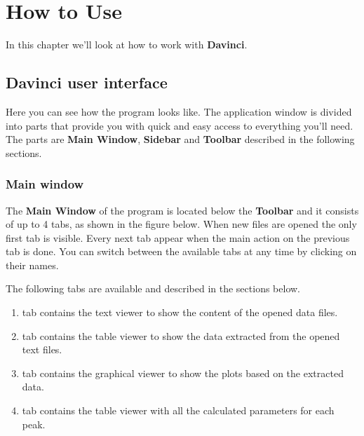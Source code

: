 \chapter{How to Use}

In this chapter we'll look at how to work with \textbf{Davinci}.

\section{Davinci user interface}

Here you can see how the program looks like. The application window is divided into parts that provide you with quick and easy access to everything you'll need. The parts are \textbf{Main Window}, \textbf{Sidebar} and \textbf{Toolbar} described in the following sections.


\subsection{Main window}

The \textbf{Main Window} of the program is located below the \textbf{Toolbar} and it consists of up to 4 tabs, as shown in the figure below. When new files are opened the only first tab is visible. Every next tab appear when the main action on the previous tab is done. You can switch between the available tabs at any time by clicking on their names.


The following tabs are available and described in the sections below.

\begin{enumerate}
	\item {} tab contains the text viewer to show the content of the opened data files.
	\item {} tab contains the table viewer to show the data extracted from the opened text files.
	\item {} tab contains the graphical viewer to show the plots based on the extracted data.
	\item {} tab contains the table viewer with all the calculated parameters for each peak.
\end{enumerate}

